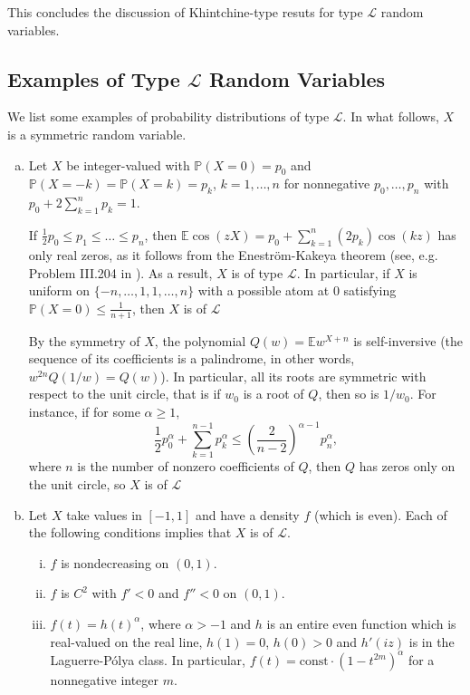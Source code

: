 \documentclass[10pt]{article}
\newcommand{\E}{\mathbb{E}}
\newcommand{\1}{\textbf{1}}
\newcommand{\sL}{\mathcal{L}}
\newcommand{\p}[1]{\mathbb{P}\left( #1 \right)}
\theoremstyle{remark}
\theoremstyle{definition}
\begin{document}
This concludes the discussion of Khintchine-type resuts for type $\mathcal{L}$ random variables.

\subsection{Examples of Type $\mathcal{L}$ Random Variables}

We list some examples of probability distributions of type $\mathcal{L}$. In what follows, $X$ is a symmetric random variable.

\begin{enumerate}[(a)]

\item 
Let $X$ be integer-valued with $\p{X = 0} = p_0$ and $\p{X = -k} = \p{X = k} = p_k$, $k = 1, \dots, n$ for nonnegative $p_0, \dots, p_n$ with $p_0 + 2\sum_{k=1}^n p_k = 1$. 

If $\frac{1}{2}p_0 \leq p_1 \leq \dots \leq p_n$, then $\E \cos(zX) = p_0 + \sum_{k=1}^n (2p_k)\cos(kz)$ has only real zeros, as it follows from the Enestr\"om-Kakeya theorem (see, e.g. Problem III.204 in \cite{PS1}). As a result, $X$ is of type $\sL$. In particular, if $X$ is uniform on $\{-n,\dots, 1, 1, \dots, n\}$ with a possible atom at $0$ satisfying $\p{X = 0} \leq \frac{1}{n+1}$, then $X$ is of $\mathcal{L}$

By the symmetry of $X$, the polynomial $Q(w) = \E w^{X+n}$ is self-inversive (the sequence of its coefficients is a palindrome, in other words, $w^{2n}Q(1/w) = Q(w)$). In particular, all its roots are symmetric with respect to the unit circle, that is if $w_0$ is a root of $Q$, then so is $1/w_0$. For instance, if for some $\alpha \geq 1$,
\[
\frac{1}{2}p_0^\alpha + \sum_{k=1}^{n-1} p_k^\alpha \leq \left(\frac{2}{n-2}\right)^{\alpha-1}p_n^\alpha,
\]
where $n$ is the number of nonzero coefficients of $Q$, then $Q$ has zeros only on the unit circle, so $X$ is of $\mathcal{L}$

\item
Let $X$ take values in $[-1,1]$ and have a density $f$ (which is even). Each of the following conditions implies that $X$ is of $\mathcal{L}$.
\begin{enumerate}[(i)]
\item $f$ is  nondecreasing on $(0,1)$.

\item $f$ is $C^2$ with $f' < 0$ and $f'' < 0$ on $(0,1)$.

\item $f(t) = h(t)^{\alpha}$, where $\alpha > -1$ and $h$ is an entire even function which is real-valued on the real line, $h(1) = 0$, $h(0) > 0$ and $h'(iz)$ is  in the Laguerre-P\'olya class. In particular, $f(t) = \text{const}\cdot (1-t^{2m})^{\alpha}$ for a nonnegative integer $m$.  
\end{enumerate}


\end{enumerate}
\end{document}
